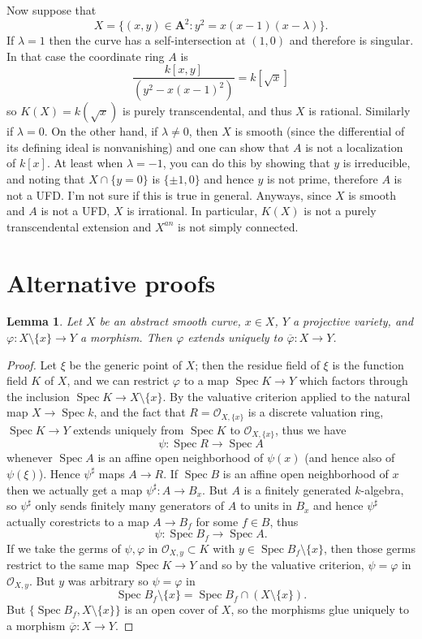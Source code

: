 \documentclass[reqno,12pt,letterpaper]{amsart}
\newcommand{\Aff}{\mathbf A}
\DeclareMathOperator{\Spec}{Spec}
\newcommand{\Olo}{\mathscr O}
\newtheorem{lemma}[theorem]{Lemma}
\theoremstyle{definition}
\begin{document}
Now suppose that
$$X = \{(x, y) \in \Aff^2: y^2 = x(x - 1)(x - \lambda)\}.$$
If $\lambda = 1$ then the curve has a self-intersection at $(1, 0)$ and therefore is singular. In that case the coordinate ring $A$ is
$$\frac{k[x, y]}{(y^2 - x(x-1)^2)} = k[\sqrt x]$$
so $K(X) = k(\sqrt x)$ is purely transcendental, and thus $X$ is rational. Similarly if $\lambda = 0$.
On the other hand, if $\lambda \neq 0$, then $X$ is smooth (since the differential of its defining ideal is nonvanishing) and one can show that $A$ is not a localization of $k[x]$.
At least when $\lambda = -1$, you can do this by showing that $y$ is irreducible, and noting that $X \cap \{y = 0\}$ is $\{\pm 1, 0\}$ and hence $y$ is not prime, therefore $A$ is not a UFD. I'm not sure if this is true in general.
Anyways, since $X$ is smooth and $A$ is not a UFD, $X$ is irrational.
In particular, $K(X)$ is not a purely transcendental extension and $X^{an}$ is not simply connected.

\appendix
\section{Alternative proofs}
\begin{lemma}
Let $X$ be an abstract smooth curve, $x \in X$, $Y$ a projective variety, and $\varphi: X \setminus \{x\} \to Y$ a morphism.
Then $\varphi$ extends uniquely to $\overline \varphi: X \to Y$.
\end{lemma}
\begin{proof}
Let $\xi$ be the generic point of $X$; then the residue field of $\xi$ is the function field $K$ of $X$, and we can restrict $\varphi$ to a map $\Spec K \to Y$
which factors through the inclusion $\Spec K \to X \setminus \{x\}$.
By the valuative criterion applied to the natural map $X \to \Spec k$, and the fact that $R = \Olo_{X, \{x\}}$ is a discrete valuation ring, $\Spec K \to Y$ extends uniquely from $\Spec K$ to $\Olo_{X,\{x\}}$, thus we have
$$\psi: \Spec R \to \Spec A$$
whenever $\Spec A$ is an affine open neighborhood of $\psi(x)$ (and hence also of $\psi(\xi)$). Hence $\psi^\sharp$ maps $A \to R$.
If $\Spec B$ is an affine open neighborhood of $x$ then we actually get a map $\psi^\sharp: A \to B_x$.
But $A$ is a finitely generated $k$-algebra, so $\psi^\sharp$ only sends finitely many generators of $A$ to units in $B_x$ and hence $\psi^\sharp$ actually corestricts to a map $A \to B_f$ for some $f \in B$, thus
$$\psi: \Spec B_f \to \Spec A.$$
If we take the germs of $\psi,\varphi$ in $\Olo_{X, y} \subset K$ with $y \in \Spec B_f\setminus \{x\}$, then those germs restrict to the same map $\Spec K \to Y$ and so by the valuative criterion, $\psi = \varphi$ in $\Olo_{X, y}$.
But $y$ was arbitrary so $\psi = \varphi$ in
$$\Spec B_f \setminus\{x\} = \Spec B_f \cap (X \setminus \{x\}).$$
But $\{\Spec B_f, X \setminus \{x\}\}$ is an open cover of $X$, so the morphisms glue uniquely to a morphism $\overline \varphi: X \to Y$.
\end{proof}




\printbibliography
\end{document}
